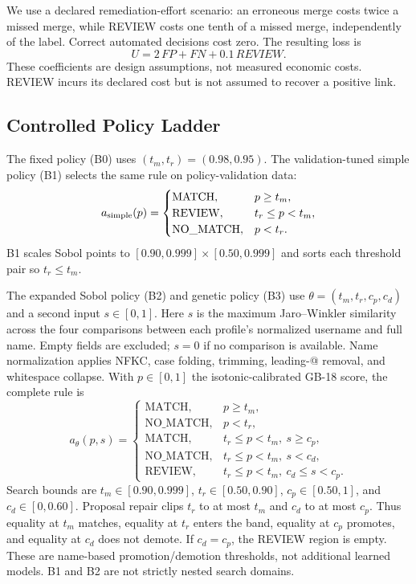 \documentclass[conference]{IEEEtran}
\begin{document}
We use a declared remediation-effort scenario: an erroneous merge costs twice a missed merge, while REVIEW costs one tenth of a missed merge, independently of the label. Correct automated decisions cost zero. The resulting loss is
\begin{equation}
U=2\,FP+FN+0.1\,REVIEW .
\end{equation}
These coefficients are design assumptions, not measured economic costs. REVIEW incurs its declared cost but is not assumed to recover a positive link.

\subsection{Controlled Policy Ladder}
The fixed policy (B0) uses $(t_m,t_r)=(0.98,0.95)$. The validation-tuned simple policy (B1) selects the same rule on policy-validation data:
\begin{equation}
a_{\rm simple}(p)=\begin{cases}
\mathrm{MATCH},&p\ge t_m,\\
\mathrm{REVIEW},&t_r\le p<t_m,\\
\mathrm{NO\_MATCH},&p<t_r.
\end{cases}
\end{equation}
B1 scales Sobol points to $[0.90,0.999]\times[0.50,0.999]$ and sorts each threshold pair so $t_r\le t_m$.

The expanded Sobol policy (B2) and genetic policy (B3) use $\theta=(t_m,t_r,c_p,c_d)$ and a second input $s\in[0,1]$. Here $s$ is the maximum Jaro--Winkler similarity across the four comparisons between each profile's normalized username and full name. Empty fields are excluded; $s=0$ if no comparison is available. Name normalization applies NFKC, case folding, trimming, leading-@ removal, and whitespace collapse. With $p\in[0,1]$ the isotonic-calibrated GB-18 score, the complete rule is
\begin{equation}
\label{eq:expanded}
a_\theta(p,s)=\begin{cases}
\mathrm{MATCH},&p\ge t_m,\\
\mathrm{NO\_MATCH},&p<t_r,\\
\mathrm{MATCH},&t_r\le p<t_m,\ s\ge c_p,\\
\mathrm{NO\_MATCH},&t_r\le p<t_m,\ s<c_d,\\
\mathrm{REVIEW},&t_r\le p<t_m,\ c_d\le s<c_p.
\end{cases}
\end{equation}
Search bounds are $t_m\in[0.90,0.999]$, $t_r\in[0.50,0.90]$, $c_p\in[0.50,1]$, and $c_d\in[0,0.60]$. Proposal repair clips $t_r$ to at most $t_m$ and $c_d$ to at most $c_p$. Thus equality at $t_m$ matches, equality at $t_r$ enters the band, equality at $c_p$ promotes, and equality at $c_d$ does not demote. If $c_d=c_p$, the REVIEW region is empty. These are name-based promotion/demotion thresholds, not additional learned models. B1 and B2 are not strictly nested search domains.
\end{document}
